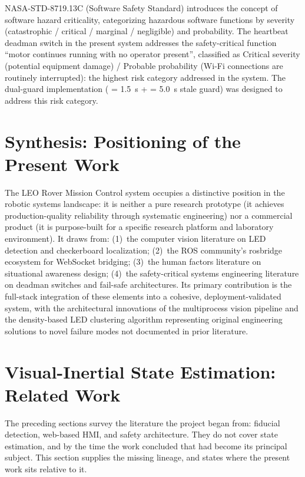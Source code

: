 NASA-STD-8719.13C (Software Safety Standard) introduces the concept of software hazard criticality, categorizing hazardous software functions by severity (catastrophic / critical / marginal / negligible) and probability. The heartbeat deadman switch in the present system addresses the safety-critical function ``motor continues running with no operator present'', classified as Critical severity (potential equipment damage) / Probable probability (Wi-Fi connections are routinely interrupted): the highest risk category addressed in the system. The dual-guard implementation ( = 1.5~s +  = 5.0~s stale guard) was designed to address this risk category.

\section{Synthesis: Positioning of the Present Work}

The LEO Rover Mission Control system occupies a distinctive position in the robotic systems landscape: it is neither a pure research prototype (it achieves production-quality reliability through systematic engineering) nor a commercial product (it is purpose-built for a specific research platform and laboratory environment). It draws from: (1)~the computer vision literature on LED detection and checkerboard localization; (2)~the ROS community's rosbridge ecosystem for WebSocket bridging; (3)~the human factors literature on situational awareness design; (4)~the safety-critical systems engineering literature on deadman switches and fail-safe architectures. Its primary contribution is the full-stack integration of these elements into a cohesive, deployment-validated system, with the architectural innovations of the multiprocess vision pipeline and the density-based LED clustering algorithm representing original engineering solutions to novel failure modes not documented in prior literature.

\section{Visual-Inertial State Estimation: Related Work}
\label{sec:sotavio}

The preceding sections survey the literature the project began from:
fiducial detection, web-based HMI, and safety architecture. They do not
cover state estimation, and by the time the work concluded that had become
its principal subject. This section supplies the missing lineage, and states
where the present work sits relative to it.


